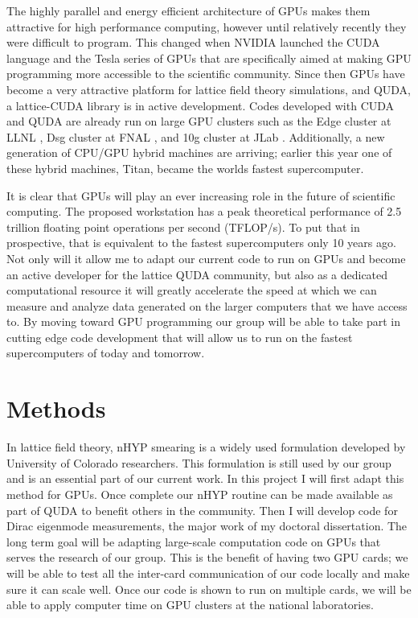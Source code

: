 \documentclass[11pt]{article}
\begin{document}
 The highly parallel and energy efficient architecture of GPUs makes them attractive for high performance computing, however until relatively recently they were difficult to program.  
 This changed when NVIDIA launched the CUDA language and the Tesla series of GPUs that are specifically aimed at making GPU programming more accessible to the scientific community.
  Since then GPUs have become a very attractive platform for lattice field theory simulations, and QUDA, a lattice-CUDA library \cite{QUDA1,QUDA2,QUDA3} is in active development.
   Codes developed with CUDA and QUDA are already run on large GPU clusters such as the Edge cluster at LLNL \cite{Edge}, Dsg cluster at FNAL \cite{Dsg}, and 10g cluster at JLab \cite{10g}.
   Additionally, a new generation of CPU/GPU hybrid machines are arriving; earlier this year one of these hybrid machines, Titan, became the worlds fastest supercomputer\cite{Titan}.

  It is clear that GPUs will play an ever increasing role in the future of scientific computing. 
  The proposed workstation has a peak theoretical performance of 2.5 trillion floating point operations per second (TFLOP/s).
  To put that in prospective, that is equivalent to the fastest supercomputers only 10 years ago.
  Not only will it allow me to adapt our current code to run on GPUs and become an active developer for the lattice QUDA community, but also as a dedicated computational resource it will greatly accelerate the speed at which we can measure and analyze data generated on the larger computers that we have access to.
  By moving toward GPU programming our group will be able to take part in cutting edge code development that will allow us to run on the fastest supercomputers of today and tomorrow.
    
   \section*{Methods} %
  In lattice field theory, nHYP smearing is a widely used formulation developed by University of Colorado researchers. 
  This formulation is still used by our group and is an essential part of our current work.
  In this project I will first adapt this method for GPUs.
  Once complete our nHYP routine can be made available as part of QUDA to benefit others in the community.
  Then I will develop code for Dirac eigenmode measurements, the major work of my doctoral dissertation.
  The long term goal will be adapting large-scale computation code on GPUs that serves the research of our group. 
  This is the benefit of having two GPU cards; we will be able to test all the inter-card communication of our code locally and make sure it can scale well. 
  Once our code is shown to run on multiple cards, we will be able to apply computer time on GPU clusters at the national laboratories. 
    
\end{document}

